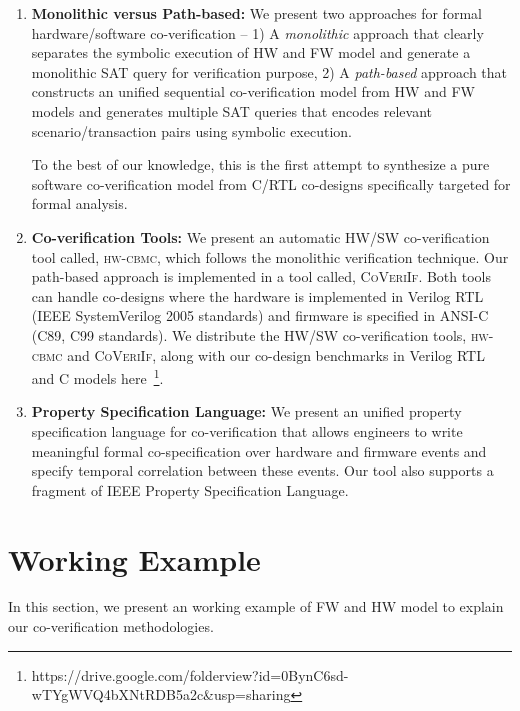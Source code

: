 \documentclass[sigconf]{acmart}
\newcommand{\tool}[1]{\textsc{#1}\xspace}
\newcommand{\hwcbmcv}{\tool{hw-cbmc}}
\newcommand{\verifox}{\tool{CoVeriIf}}
\begin{document}
\begin{enumerate}
  
  \item \textbf{Monolithic versus Path-based:} We present two approaches for formal hardware/software co-verification
    -- 1) A \emph{monolithic} approach that clearly separates the symbolic
    execution of HW and FW model and generate a monolithic SAT query for 
    verification purpose, 2) A \emph{path-based} approach that constructs
    an unified sequential co-verification model from HW and FW models and
    generates multiple SAT queries that encodes relevant scenario/transaction 
    pairs using symbolic execution.  
    
    To the best of our knowledge, this is the first attempt to synthesize a pure 
    software co-verification model from C/RTL co-designs specifically targeted 
    for formal analysis.   
  
  \item \textbf{Co-verification Tools:} We present an automatic HW/SW co-verification tool called, \hwcbmcv,
    which follows the monolithic verification technique.  Our path-based 
    approach is implemented in a tool called, \verifox. Both tools can handle
    co-designs where the hardware is implemented in Verilog RTL (IEEE
    SystemVerilog 2005 standards) and firmware is  
    specified in ANSI-C (C89, C99 standards).  We distribute the HW/SW 
    co-verification tools, \hwcbmcv and \verifox, along with our co-design 
    benchmarks in Verilog RTL and C models 
    here~\footnote{https://drive.google.com/folderview?id=0BynC6sd-wTYgWVQ4bXNtRDB5a2c\&usp=sharing}. 

  \item \textbf{Property Specification Language:} We present an unified property
    specification language for co-verification that allows engineers to write meaningful 
     formal co-specification over hardware and firmware events and specify
     temporal correlation between these events.  Our tool also supports a
     fragment of IEEE Property Specification Language. 
     
    
\end{enumerate}
%
\section{Working Example}
In this section, we present an working example of FW and HW model to explain our 
co-verification methodologies.  
\end{document}
